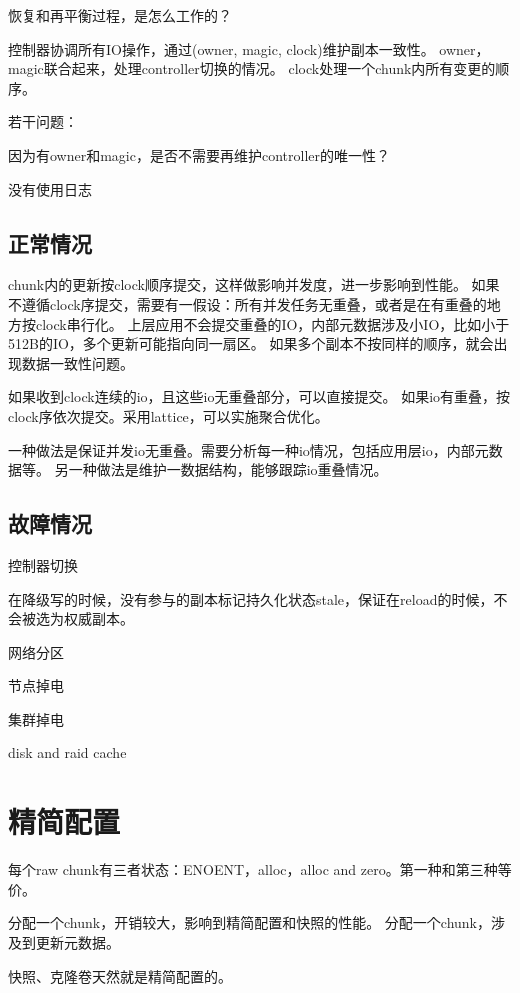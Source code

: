 恢复和再平衡过程，是怎么工作的？

控制器协调所有IO操作，通过(owner, magic, clock)维护副本一致性。
owner，magic联合起来，处理controller切换的情况。
clock处理一个chunk内所有变更的顺序。

若干问题：
\begin{enumbox}
\item 因为有owner和magic，是否不需要再维护controller的唯一性？
\item 没有使用日志
\end{enumbox}

\subsection{正常情况}

chunk内的更新按clock顺序提交，这样做影响并发度，进一步影响到性能。
如果不遵循clock序提交，需要有一假设：所有并发任务无重叠，或者是在有重叠的地方按clock串行化。
上层应用不会提交重叠的IO，内部元数据涉及小IO，比如小于512B的IO，多个更新可能指向同一扇区。
如果多个副本不按同样的顺序，就会出现数据一致性问题。

如果收到clock连续的io，且这些io无重叠部分，可以直接提交。
如果io有重叠，按clock序依次提交。采用lattice，可以实施聚合优化。

一种做法是保证并发io无重叠。需要分析每一种io情况，包括应用层io，内部元数据等。
另一种做法是维护一数据结构，能够跟踪io重叠情况。

\subsection{故障情况}

控制器切换

在降级写的时候，没有参与的副本标记持久化状态stale，保证在reload的时候，不会被选为权威副本。

网络分区

节点掉电

集群掉电

disk and raid cache

\section{精简配置}

每个raw chunk有三者状态：ENOENT，alloc，alloc and zero。第一种和第三种等价。

分配一个chunk，开销较大，影响到精简配置和快照的性能。
分配一个chunk，涉及到更新元数据。

快照、克隆卷天然就是精简配置的。

